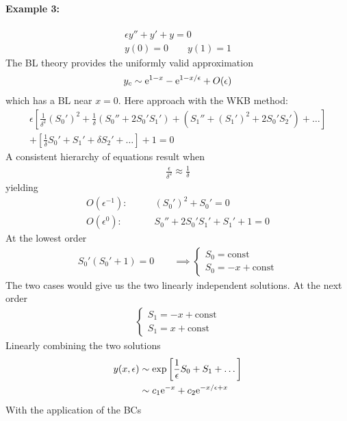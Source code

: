 \paragraph{Example 3:} 
\begin{gather*}
	\epsilon y'' + y' + y = 0 \\
	y(0) = 0 \qquad y(1) = 1
\end{gather*}
The BL theory provides the uniformly valid approximation 
\begin{gather*}
	y_c \sim \mathrm{e}^{1-x} - \mathrm{e}^{1-x/\epsilon} + O(\epsilon)
\end{gather*}
which has a BL near $x=0$. Here approach with the WKB method:
\begin{gather*}
	\epsilon \left[\frac{1}{\delta^2} (S_0')^2 + \frac{1}{\delta} (S_0'' + 2 S_0' S_1') + (S_1'' + (S_1')^2 + 2 S_0' S_2') + \dots\right] \\
	+ \left[\frac{1}{\delta}S_0' + S_1' + \delta S_2' + \dots \right] + 1 = 0
\end{gather*}
A consistent hierarchy of equations result when 
\begin{gather*}
	\frac{\epsilon}{\delta^2} \approx \frac{1}{\delta}
\end{gather*}
yielding
\begin{align*}
	O\left(\epsilon^{-1}\right):& \qquad  (S_0')^2 + S_0' = 0 \\
	O(\epsilon^0): & \qquad S_0'' + 2S_0'S_1' + S_1' + 1=0
\end{align*}
At the lowest order
\begin{align*}
	S_0'(S_0'+1) = 0 \qquad \implies 
	\begin{cases}
		S_0 = \text{const} \\
		S_0 = -x + \text{const}
	\end{cases} 
\end{align*}
The two cases would give us the two linearly independent solutions. At the next order
\begin{align*}
	\begin{cases}
		S_1 = -x + \text{const} \\
		S_1 = x + \text{const}
	\end{cases}
\end{align*}
Linearly combining the two solutions
\begin{align*}
	y(x,\epsilon) &\sim \exp \left[\frac{1}{\epsilon} S_0 + S_1 + \dots \right] \\
	&\sim c_1 \mathrm{e}^{-x} + c_2 \mathrm{e}^{- x/\epsilon + x}
\end{align*}
With the application of the BCs
